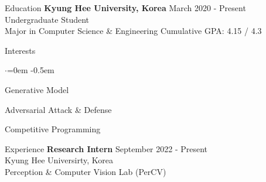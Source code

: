 \documentclass{resume}
\begin{document}
  \begin{rSection}{Education}
    {\bf Kyung Hee University, Korea } \hfill {March 2020 - Present} \\ 
    { Undergraduate Student } \\
    { Major in Computer Science \& Engineering \hfill Cumulative GPA: 4.15 / 4.3 }
  \end{rSection}
  
  \begin{rSection}{Interests}
    \begin{list}{$\cdot$}{\leftmargin=0em}
      \itemsep -0.5em
        \item Generative Model
        \item Adversarial Attack \& Defense
        \item Competitive Programming
    \end{list}
  \end{rSection}

  \begin{rSection}{Experience}
    {\bf Research Intern } \hfill {September 2022 - Present} \\ 
    { Kyung Hee Universirty, Korea } \\
    { Perception \& Computer Vision Lab (PerCV) }
  \end{rSection}
\end{document}
